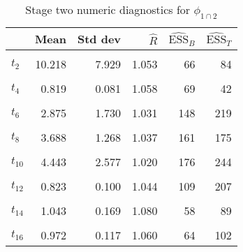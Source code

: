\begin{table}

\caption{\label{tab:surv-stage-two-diag-phi-12}Stage two numeric diagnostics for $\phi_{1 \cap 2}$}
\centering
\begin{tabular}[t]{lrrrrr}
\toprule
  & Mean & Std dev & $\widehat{R}$ & $\widehat{\text{ESS}}_{B}$ & $\widehat{\text{ESS}}_{T}$\\
\midrule
\cellcolor{gray!6}{$t_{1}$} & \cellcolor{gray!6}{2.783} & \cellcolor{gray!6}{1.820} & \cellcolor{gray!6}{1.076} & \cellcolor{gray!6}{65} & \cellcolor{gray!6}{34}\\
$t_{2}$ & 10.218 & 7.929 & 1.053 & 66 & 84\\
\cellcolor{gray!6}{$t_{3}$} & \cellcolor{gray!6}{6.536} & \cellcolor{gray!6}{3.139} & \cellcolor{gray!6}{1.037} & \cellcolor{gray!6}{148} & \cellcolor{gray!6}{129}\\
$t_{4}$ & 0.819 & 0.081 & 1.058 & 69 & 42\\
\cellcolor{gray!6}{$t_{5}$} & \cellcolor{gray!6}{0.838} & \cellcolor{gray!6}{0.099} & \cellcolor{gray!6}{1.054} & \cellcolor{gray!6}{96} & \cellcolor{gray!6}{55}\\
$t_{6}$ & 2.875 & 1.730 & 1.031 & 148 & 219\\
\cellcolor{gray!6}{$t_{7}$} & \cellcolor{gray!6}{1.125} & \cellcolor{gray!6}{0.089} & \cellcolor{gray!6}{1.054} & \cellcolor{gray!6}{140} & \cellcolor{gray!6}{133}\\
$t_{8}$ & 3.688 & 1.268 & 1.037 & 161 & 175\\
\cellcolor{gray!6}{$t_{9}$} & \cellcolor{gray!6}{0.901} & \cellcolor{gray!6}{0.114} & \cellcolor{gray!6}{1.070} & \cellcolor{gray!6}{116} & \cellcolor{gray!6}{92}\\
$t_{10}$ & 4.443 & 2.577 & 1.020 & 176 & 244\\
\cellcolor{gray!6}{$t_{11}$} & \cellcolor{gray!6}{0.888} & \cellcolor{gray!6}{0.117} & \cellcolor{gray!6}{1.033} & \cellcolor{gray!6}{159} & \cellcolor{gray!6}{206}\\
$t_{12}$ & 0.823 & 0.100 & 1.044 & 109 & 207\\
\cellcolor{gray!6}{$t_{13}$} & \cellcolor{gray!6}{4.612} & \cellcolor{gray!6}{1.828} & \cellcolor{gray!6}{1.057} & \cellcolor{gray!6}{92} & \cellcolor{gray!6}{28}\\
$t_{14}$ & 1.043 & 0.169 & 1.080 & 58 & 89\\
\cellcolor{gray!6}{$t_{15}$} & \cellcolor{gray!6}{12.530} & \cellcolor{gray!6}{8.200} & \cellcolor{gray!6}{1.050} & \cellcolor{gray!6}{130} & \cellcolor{gray!6}{85}\\
$t_{16}$ & 0.972 & 0.117 & 1.060 & 64 & 102\\
\bottomrule
\end{tabular}
\end{table}